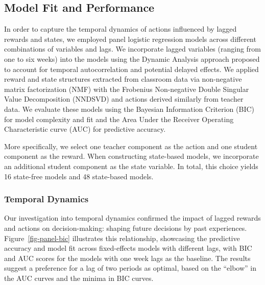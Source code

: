 \documentclass[
  number,
  preprint,
  3p,
  onecolumn]{elsarticle}
\begin{document}
\subsection{Model Fit and Performance}\label{model-fit-and-performance}

In order to capture the temporal dynamics of actions influenced by
lagged rewards and states, we employed panel logistic regression models
across different combinations of variables and lags. We incorporate
lagged variables (ranging from one to six weeks) into the models using
the Dynamic Analysis approach proposed to account for temporal
autocorrelation and potential delayed effects. We applied reward and
state structures extracted from classroom data via non-negative matrix
factorization (NMF) with the Frobenius Non-negative Double Singular
Value Decomposition (NNDSVD) and actions derived similarly from teacher
data. We evaluate these models using the Bayesian Information Criterion
(BIC) for model complexity and fit and the Area Under the Receiver
Operating Characteristic curve (AUC) for predictive accuracy.

More specifically, we select one teacher component as the action and one
student component as the reward. When constructing state-based models,
we incorporate an additional student component as the state variable. In
total, this choice yields 16 state-free models and 48 state-based
models.

\subsubsection{Temporal Dynamics}\label{temporal-dynamics}

Our investigation into temporal dynamics confirmed the impact of lagged
rewards and actions on decision-making: shaping future decisions by past
experiences. Figure~\ref{fig-panel-bic} illustrates this relationship,
showcasing the predictive accuracy and model fit across fixed-effects
models with different lags, with BIC and AUC scores for the models with
one week lags as the baseline. The results suggest a preference for a
lag of two periods as optimal, based on the ``elbow'' in the AUC curves
and the minima in BIC curves.
\end{document}
